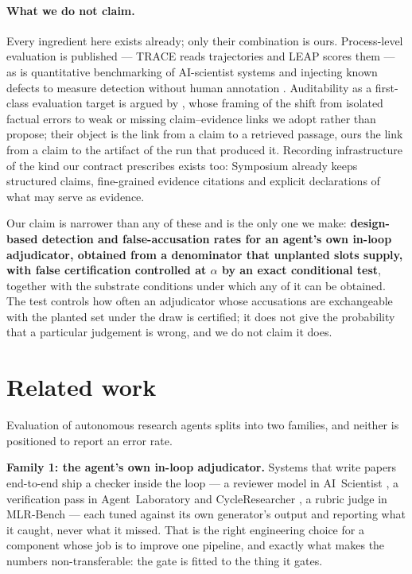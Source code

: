 \documentclass[10pt]{article}
\begin{document}
\paragraph{What we do not claim.} Every ingredient here exists already; only
their combination is ours. Process-level evaluation is published --- TRACE
\cite{trace} reads trajectories and LEAP \cite{leap} scores them --- as is
quantitative benchmarking of AI-scientist systems \cite{caneval} and injecting
known defects to measure detection without human annotation \cite{ara}.
Auditability as a first-class evaluation target is argued by \cite{fluent},
whose framing of the shift from isolated factual errors to weak or missing
claim--evidence links we adopt rather than propose; their object is the link
from a claim to a retrieved passage, ours the link from a claim to the artifact
of the run that produced it. Recording infrastructure of the kind our contract
prescribes exists too: Symposium \cite{symposium} already keeps structured
claims, fine-grained evidence citations and explicit declarations of what may
serve as evidence.

Our claim is narrower than any of these and is the only one we make:
\textbf{design-based detection and false-accusation rates for an agent's own
in-loop adjudicator, obtained from a denominator that unplanted slots supply,
with false certification controlled at $\alpha$ by an exact conditional test},
together with the substrate conditions under which any of it can be obtained.
The test controls how often an adjudicator whose accusations are exchangeable with the
planted set under the draw is certified; it does not
give the probability that a particular judgement is wrong, and we do not claim
it does.

\section{Related work}
\label{sec:related}

Evaluation of autonomous research agents splits into two families, and neither
is positioned to report an error rate.

\textbf{Family 1: the agent's own in-loop adjudicator.} Systems that write
papers end-to-end ship a checker inside the loop --- a reviewer model in
AI~Scientist \cite{lu2024ai,yamada2025aiscientistv2}, a verification pass in
Agent~Laboratory \cite{schmidgall2025agentlaboratory} and CycleResearcher
\cite{weng2025cycleresearcher}, a rubric judge in MLR-Bench \cite{mlrbench} ---
each tuned against its own generator's output and reporting what it caught,
never what it missed. That is the right engineering choice for a component whose
job is to improve one pipeline, and exactly what makes the numbers
non-transferable: the gate is fitted to the thing it gates.
\end{document}
